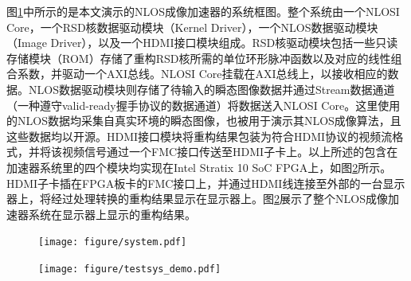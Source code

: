 \documentclass[master]{shtthesis}             %
\begin{document}
图\ref{fig:nlossys}中所示的是本文演示的NLOS成像加速器的系统框图。整个系统由一个NLOSI Core，一个RSD核数据驱动模块（Kernel Driver），一个NLOS数据驱动模块（Image Driver），以及一个HDMI接口模块组成。RSD核驱动模块包括一些只读存储模块（ROM）存储了重构RSD核所需的单位环形脉冲函数以及对应的线性组合系数，并驱动一个AXI总线。NLOSI Core挂载在AXI总线上，以接收相应的数据。NLOS数据驱动模块则存储了待输入的瞬态图像数据并通过Stream数据通道（一种遵守valid-ready握手协议的数据通道）将数据送入NLOSI Core。这里使用的NLOS数据均采集自真实环境的瞬态图像，也被\citet{Liu,Liu2019}用于演示其NLOS成像算法，且这些数据均以开源。HDMI接口模块将重构结果包装为符合HDMI协议的视频流格式，并将该视频信号通过一个FMC接口传送至HDMI子卡上。以上所述的包含在加速器系统里的四个模块均实现在Intel Stratix 10 SoC FPGA上，如图\ref{fig:testsys}所示。HDMI子卡插在FPGA板卡的FMC接口上，并通过HDMI线连接至外部的一台显示器上，将经过处理转换的重构结果显示在显示器上。图\ref{fig:testsys}展示了整个NLOS成像加速器系统在显示器上显示的重构结果。
\begin{table}[!t]
    \centering
    \label{tab:perf_comp}
\end{table}

\begin{figure}[!tb]
  \centering
  \texttt{[image: figure/system.pdf]}
  \label{fig:nlossys}
\end{figure}

\begin{figure}[!tb]
  \centering
  \texttt{[image: figure/testsys\_demo.pdf]}
  \label{fig:testsys}
\end{figure}
\end{document}
